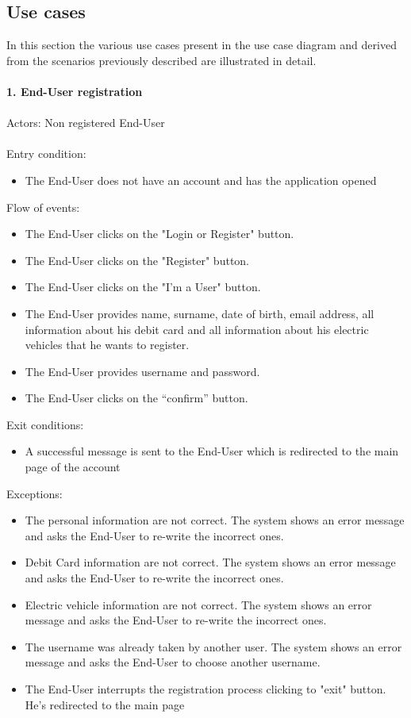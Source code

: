 \documentclass[a4paper]{report}
\begin{document}
\subsection{Use cases}
In this section the various use cases present in the use case diagram and derived from the scenarios previously described are illustrated in detail.\\ \\
\textbf{1. End-User registration}\label{uc:1}
\\
\\
Actors: Non registered End-User\\ \\
Entry condition:
\begin{itemize}
\item The End-User does not have an account and has the application opened
\end{itemize}
Flow of events:
\begin{itemize}
\item The End-User clicks on the "Login or Register" button.
\item The End-User clicks on the "Register" button.
\item The End-User clicks on the "I'm a User" button.
\item The End-User provides name, surname, date of birth, email address, all information about his debit card and all information about his electric vehicles that he wants to register.
\item The End-User provides username and password.
\item The End-User clicks on the “confirm” button.
\end{itemize}
Exit conditions:
\begin{itemize}
\item A successful message is sent to the End-User which is redirected to the main page of the account
\end{itemize}
Exceptions:
\begin{itemize}
\item The personal information are not correct. The system shows an error message and asks the End-User to re-write the incorrect ones.
\item Debit Card information are not correct. The system shows an error message and asks the End-User to re-write the incorrect ones.
\item Electric vehicle information are not correct. The system shows an error message and asks the End-User to re-write the incorrect ones.
\item The username was already taken by another user. The system shows an error message and asks the End-User to choose another username.
\item The End-User interrupts the registration process clicking to "exit" button. He's redirected to the main page
\end{itemize}
\end{document}
